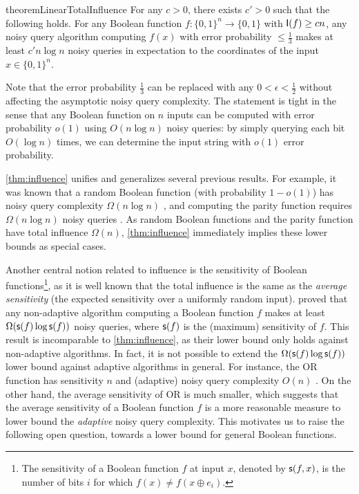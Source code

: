 \begin{restatable}{theorem}{LinearTotalInfluence} \label{thm:influence}
  For any $c>0$, there exists $c'>0$ such that the following holds.
  For any Boolean function $f: \{0,1\}^n\to \{0,1\}$ with $\operatorname{\mathsf{I}}(f) \ge c n$, any noisy query algorithm computing $f(x)$ with error probability $\le \frac 13$ makes at least $c' n\log n$ noisy queries in expectation to the coordinates of the input $x \in \{0, 1\}^n$.
\end{restatable}
Note that the error probability $\frac 13$ can be replaced with any $0<\epsilon<\frac 12$ without affecting the asymptotic noisy query complexity. The statement is tight in the sense that any Boolean function on $n$ inputs can be computed with error probability $o(1)$ using $O(n\log n)$ noisy queries: by simply querying each bit $O(\log n)$ times, we can determine the input string with $o(1)$ error probability.

\cref{thm:influence} unifies and generalizes several previous results. For example, it was known that a random Boolean function (with probability $1-o(1)$) has noisy query complexity $\Omega(n\log n)$ \cite{reischuk1991reliable,feige1992complexity,evans1998average}, and computing the parity function requires $\Omega(n\log n)$ noisy queries \cite{feige1994computing}. As random Boolean functions and the parity function have total influence $\Omega(n)$, \cref{thm:influence} immediately implies these lower bounds as special cases.


Another central notion related to influence is the sensitivity of Boolean functions\footnote{The sensitivity of a Boolean function $f$ at input $x$, denoted by $\operatorname{\mathsf{s}}(f, x)$, is the number of bits $i$ for which $f(x) \ne f(x\oplus e_i)$. }, as it is well known that the total influence is the same as the \emph{average sensitivity} (the expected sensitivity over a uniformly random input). \cite{reischuk1991reliable} proved that any non-adaptive algorithm computing a Boolean function $f$ makes at least $\Omega(\operatorname{\mathsf{s}}(f)\log \operatorname{\mathsf{s}}(f))$ noisy queries, where $\operatorname{\mathsf{s}}(f)$ is the (maximum) sensitivity of $f$. This result is incomparable to \cref{thm:influence}, as their lower bound only holds against non-adaptive algorithms. In fact, it is not possible to extend the $\Omega(\operatorname{\mathsf{s}}(f)\log \operatorname{\mathsf{s}}(f))$ lower bound against adaptive algorithms in general. For instance, the $\mathrm{OR}$ function has sensitivity $n$ and (adaptive) noisy query complexity $O(n)$ \cite{feige1994computing}. On the other hand, the average sensitivity of $\mathrm{OR}$ is much smaller, which suggests that the average sensitivity of a Boolean function $f$ is a more reasonable measure to lower bound the \emph{adaptive} noisy query complexity. This motivates us to raise the following open question, towards a lower bound for general Boolean functions.

